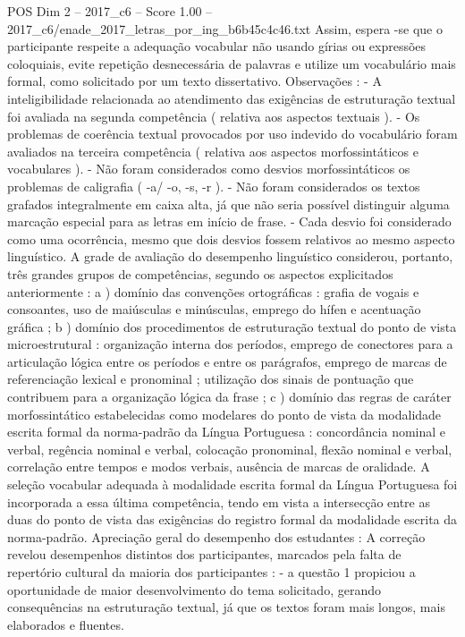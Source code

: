 \begin{textsample}{POS Dim 2 – 2017\_c6 – Score 1.00 – 2017\_c6/enade\_2017\_letras\_por\_ing\_b6b45c4c46.txt}
Assim, espera -se que o participante respeite a adequação vocabular não usando gírias ou expressões coloquiais, evite repetição desnecessária de palavras e utilize um vocabulário mais formal, como solicitado por um texto dissertativo.
Observações : - A inteligibilidade relacionada ao atendimento das exigências de estruturação textual foi avaliada na segunda competência ( relativa aos aspectos textuais ). - Os problemas de coerência textual provocados por uso indevido do vocabulário foram avaliados na terceira competência ( relativa aos aspectos morfossintáticos e vocabulares ). - Não foram considerados como desvios morfossintáticos os problemas de caligrafia ( -a/ -o, -s, -r ). - Não foram considerados os textos grafados integralmente em caixa alta, já que não seria possível distinguir alguma marcação especial para as letras em início de frase. - Cada desvio foi considerado como uma ocorrência, mesmo que dois desvios fossem relativos ao mesmo aspecto linguístico.
A grade de avaliação do desempenho linguístico considerou, portanto, três grandes grupos de competências, segundo os aspectos explicitados anteriormente : a ) domínio das convenções ortográficas : grafia de vogais e consoantes, uso de maiúsculas e minúsculas, emprego do hífen e acentuação gráfica ; b ) domínio dos procedimentos de estruturação textual do ponto de vista microestrutural : organização interna dos períodos, emprego de conectores para a articulação lógica entre os períodos e entre os parágrafos, emprego de marcas de referenciação lexical e pronominal ; utilização dos sinais de pontuação que contribuem para a organização lógica da frase ; c ) domínio das regras de caráter morfossintático estabelecidas como modelares do ponto de vista da modalidade escrita formal da norma-padrão da Língua Portuguesa : concordância nominal e verbal, regência nominal e verbal, colocação pronominal, flexão nominal e verbal, correlação entre tempos e modos verbais, ausência de marcas de oralidade.
A seleção vocabular adequada à modalidade escrita formal da Língua Portuguesa foi incorporada a essa última competência, tendo em vista a intersecção entre as duas do ponto de vista das exigências do registro formal da modalidade escrita da norma-padrão.
Apreciação geral do desempenho dos estudantes : A correção revelou desempenhos distintos dos participantes, marcados pela falta de repertório cultural da maioria dos participantes : - a questão 1 propiciou a oportunidade de maior desenvolvimento do tema solicitado, gerando consequências na estruturação textual, já que os textos foram mais longos, mais elaborados e fluentes.

\end{textsample}

